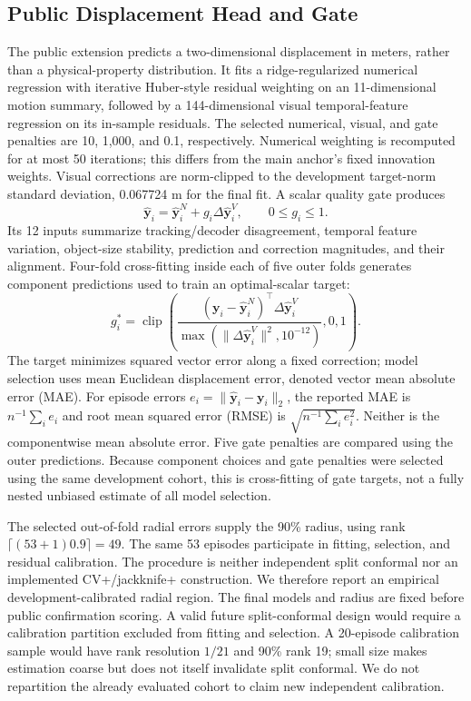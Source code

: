 \documentclass{ieeeaccess}
\begin{document}
\subsection{Public Displacement Head and Gate}
The public extension predicts a two-dimensional displacement in meters, rather than a physical-property distribution. It fits a ridge-regularized numerical regression with iterative Huber-style residual weighting on an 11-dimensional motion summary, followed by a 144-dimensional visual temporal-feature regression on its in-sample residuals. The selected numerical, visual, and gate penalties are 10, 1,000, and 0.1, respectively. Numerical weighting is recomputed for at most 50 iterations; this differs from the main anchor's fixed innovation weights. Visual corrections are norm-clipped to the development target-norm standard deviation, 0.067724 m for the final fit. A scalar quality gate produces
\begin{equation}
\hat{\bm y}_i=\hat{\bm y}_i^N+g_i\Delta\hat{\bm y}_i^V,\qquad 0\leq g_i\leq1.\label{eq:gate}
\end{equation}
Its 12 inputs summarize tracking/decoder disagreement, temporal feature variation, object-size stability, prediction and correction magnitudes, and their alignment. Four-fold cross-fitting inside each of five outer folds generates component predictions used to train an optimal-scalar target:
\begin{equation}
g_i^*=\operatorname{clip}\!\left(\frac{(\bm y_i-\hat{\bm y}_i^N)^\top\Delta\hat{\bm y}_i^V}{\max(\|\Delta\hat{\bm y}_i^V\|^2,10^{-12})},0,1\right).
\end{equation}
The target minimizes squared vector error along a fixed correction; model selection uses mean Euclidean displacement error, denoted vector mean absolute error (MAE). For episode errors $e_i=\|\hat{\bm y}_i-\bm y_i\|_2$, the reported MAE is $n^{-1}\sum_i e_i$ and root mean squared error (RMSE) is $\sqrt{n^{-1}\sum_i e_i^2}$. Neither is the componentwise mean absolute error. Five gate penalties are compared using the outer predictions. Because component choices and gate penalties were selected using the same development cohort, this is cross-fitting of gate targets, not a fully nested unbiased estimate of all model selection.

The selected out-of-fold radial errors supply the 90\% radius, using rank $\lceil(53+1)0.9\rceil=49$. The same 53 episodes participate in fitting, selection, and residual calibration. The procedure is neither independent split conformal nor an implemented CV+/jackknife+ construction. We therefore report an empirical development-calibrated radial region. The final models and radius are fixed before public confirmation scoring. A valid future split-conformal design would require a calibration partition excluded from fitting and selection. A 20-episode calibration sample would have rank resolution $1/21$ and 90\% rank 19; small size makes estimation coarse but does not itself invalidate split conformal. We do not repartition the already evaluated cohort to claim new independent calibration.
\end{document}
